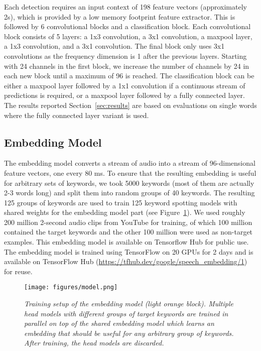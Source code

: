 \documentclass{article}
\begin{document}
Each detection requires an input context of 198 feature vectors (approximately 2s), which is provided by a low memory footprint feature extractor. This is followed by 6 convolutional blocks and a classification block. Each convolutional block consists of 5 layers: a 1x3 convolution, a 3x1 convolution, a maxpool layer, a 1x3 convolution, and a 3x1 convolution. The final block only uses 3x1 convolutions as the frequency dimension is 1 after the previous layers. Starting with 24 channels in the first block, we increase the number of channels by 24 in each new block until a maximum of 96 is reached.
The classification block can be either a maxpool layer followed by a 1x1 convolution if a continuous stream of  predictions is required, or a maxpool layer followed by a fully connected layer. The results reported Section~\ref{sec:results} are based on evaluations on single words where the fully connected layer variant is used.


\subsection{Embedding Model}
\label{sec:model_architecture:embedding_model}
The embedding model converts a stream of audio into a stream of 96-dimensional feature vectors, one every 80 ms. To ensure that the resulting embedding is useful for arbitrary sets of keywords, we took 5000 keywords (most of them are actually 2-3 words long) and split them into random groups of 40 keywords. The resulting 125 groups of keywords are used to train 125 keyword spotting models with shared weights for the embedding model part (see Figure~\ref{fig:model_train}). We used roughly 200 million 2-second audio clips from YouTube for training, of which 100 million contained the target keywords and the other 100 million were used as non-target examples. This embedding model is available on Tensorflow Hub for public use. The embedding model is trained using TensorFlow \cite{abadi2016tensorflow} on 20 GPUs for 2 days and is available on TensorFlow Hub (\url{https://tfhub.dev/google/speech_embedding/1}) for reuse. 
 
 \begin{figure}[t]
    \centering
\texttt{[image: figures/model.png]}
    \caption{\textit{Training setup of the embedding model (light orange block). Multiple head models with different groups of target keywords are trained in parallel on top of the shared embedding model which learns an embedding that should be useful for any arbitrary group of keywords. After training, the head models are discarded. \vspace{-0.3cm}}}
    \label{fig:model_train}
\end{figure}
 
\end{document}
